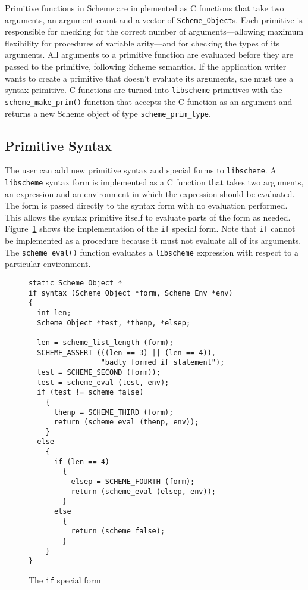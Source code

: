 Primitive functions in Scheme are implemented as C functions that take
two arguments, an argument count and a vector of
\verb+Scheme_Object+s.  Each primitive is responsible for checking for
the correct number of arguments---allowing maximum flexibility for
procedures of variable arity---and for checking the types of its
arguments.  All arguments to a primitive function are evaluated before
they are passed to the primitive, following Scheme semantics.  If the
application writer wants to create a primitive that doesn't evaluate
its arguments, she must use a syntax primitive.  C functions are
turned into \verb+libscheme+ primitives with the
\verb+scheme_make_prim()+ function that accepts the C function as an
argument and returns a new Scheme object of type
\verb+scheme_prim_type+. 

\subsection{Primitive Syntax}

The user can add new primitive syntax and special forms to
\verb+libscheme+.  A \verb+libscheme+ syntax form is implemented as a
C function that takes two arguments, an expression and an environment
in which the expression should be evaluated.  The form is passed
directly to the syntax form with no evaluation performed.  This allows
the syntax primitive itself to evaluate parts of the form as needed.
Figure~\ref{fig:if} shows the implementation of the \verb+if+ special
form.  Note that \verb+if+ cannot be implemented as a procedure
because it must not evaluate all of its arguments.  The
\verb+scheme_eval()+ function evaluates a \verb+libscheme+ expression
with respect to a particular environment.

\begin{figure}[htbp]
\begin{center}
\begin{verbatim}
static Scheme_Object *
if_syntax (Scheme_Object *form, Scheme_Env *env)
{
  int len;
  Scheme_Object *test, *thenp, *elsep;

  len = scheme_list_length (form);
  SCHEME_ASSERT (((len == 3) || (len == 4)), 
                 "badly formed if statement");
  test = SCHEME_SECOND (form));
  test = scheme_eval (test, env);
  if (test != scheme_false)
    {
      thenp = SCHEME_THIRD (form);
      return (scheme_eval (thenp, env));
    }
  else
    {
      if (len == 4)
        {
          elsep = SCHEME_FOURTH (form);
          return (scheme_eval (elsep, env));
        }
      else
        {
          return (scheme_false);
        }
    }
}
\end{verbatim}    
\end{center}
  \caption{The {\tt if} special form}
  \label{fig:if}
\end{figure}


